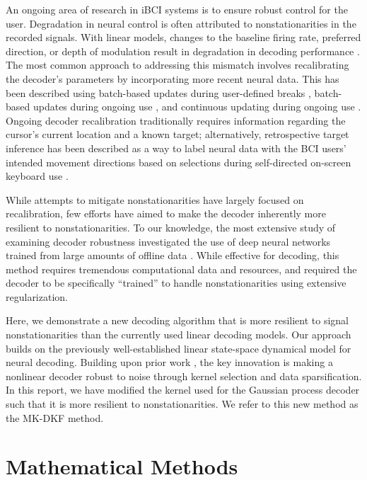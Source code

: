 An ongoing area of research in iBCI systems is to ensure robust control for the user. Degradation in neural control is often attributed to nonstationarities in the recorded signals. With linear models, changes to the baseline firing rate, preferred direction, or depth of modulation result in degradation in decoding performance \cite{Sussillo2015, Jarosiewicz2015, Perge2013}. The most common approach to addressing this mismatch involves recalibrating the decoder's parameters by incorporating more recent neural data. This has been described using batch-based updates during user-defined breaks \cite{Jarosiewicz2015, Bacher2015, Gilja2015}, batch-based updates during ongoing use \cite{Orsborn2014, Shpigelman2008}, and continuous updating during ongoing use \cite{Shanechi2014, Shanechi2016, Dangi2011}. Ongoing decoder recalibration traditionally requires information regarding the cursor's current location and a known target; alternatively, retrospective target inference has been described as a way to label neural data with the BCI users' intended movement directions based on selections during self-directed on-screen keyboard use \cite{Jarosiewicz2015}.  

While attempts to mitigate nonstationarities have largely focused on recalibration, few efforts have aimed to make the decoder inherently more resilient to nonstationarities. To our knowledge, the most extensive study of examining decoder robustness investigated the use of deep neural networks trained from large amounts of offline data \cite{Sussillo2016a}. While effective for decoding, this method requires tremendous computational data and resources, and required the decoder to be specifically ``trained'' to handle nonstationarities using extensive regularization. 

Here, we demonstrate a new decoding algorithm that is more resilient to signal nonstationarities than the currently used linear decoding models. Our approach builds on the previously well-established linear state-space dynamical model for neural decoding. Building upon prior work \cite{Brandman2018}, the key innovation is making a nonlinear decoder robust to noise through kernel selection and data sparsification. In this report, we have modified the kernel used for the Gaussian process decoder such that it is more resilient to nonstationarities. We refer to this new method as the MK-DKF method.

\section{Mathematical Methods}

